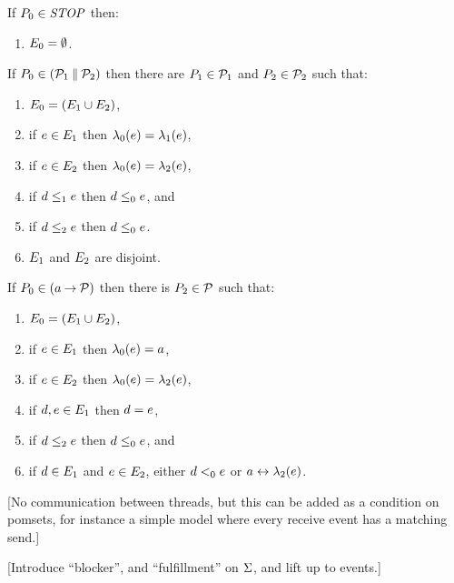 \begin{figure*}
  If $P_0\in\mathit{STOP}$ then:
  \begin{enumerate}
    \item $E_0 = \emptyset$.
  \end{enumerate}
  If $P_0 \in (\mathcal{P}_1\mathbin{\parallel}\mathcal{P}_2)$ then
  there are $P_1\in\mathcal{P}_1$ and $P_2\in\mathcal{P}_2$ such that:
  \begin{enumerate}
  \item $E_0 = (E_1\cup E_2)$,
  \item if $e\in E_1$ then $\lambda_0(e) = \lambda_1(e)$, 
  \item if $e\in E_2$ then $\lambda_0(e) = \lambda_2(e)$,
  \item if $d\le_1e$ then $d\le_0e$, and
  \item if $d\le_2e$ then $d\le_0e$.
    \setcounter{pomsetwParCount}{\value{enumi}}
  \item $E_1$ and $E_2$ are disjoint.
    \setcounter{pomsetParCount}{\value{enumi}}
  \end{enumerate}
  If $\aPS_0 \in (\aAct\wPREFIX\aPSS)$ then there is $P_2\in\mathcal{P}$ such that:
  \begin{enumerate}
  \item $E_0=(E_1 \cup E_2)$,
  \item if $e\in E_1$ then $\lambda_0(e) = a$,
  \item if $e\in E_2$ then $\lambda_0(e) = \lambda_2(e)$,
  \item if $d,e\in E_1$ then $d=e$,
  \item if $d\le_2e$ then $d\le_0e$, and
    \setcounter{pomsetPrefixCount}{\value{enumi}}
  \item if $d\in E_1$ and $e\in E_2$, either $d<_0e$ or $a\mathrel\leftrightarrow\lambda_2(e)$.
  \end{enumerate}
\caption{Process algebra as sets of pomsets}
\label{tab:pomsets}
\end{figure*}

[No communication between threads, but this can be added as a condition on pomsets,
  for instance a simple model where every receive event has a matching send.]

[Introduce ``blocker'', and ``fulfillment'' on $\Sigma$, and lift up to events.]

